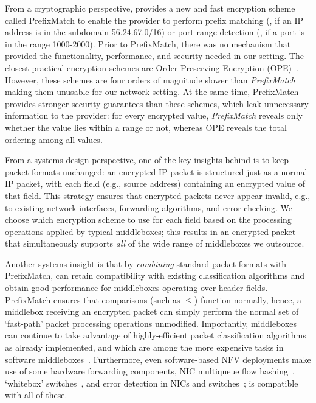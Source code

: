 From a cryptographic perspective, \sys provides a new and fast encryption scheme called PrefixMatch  to enable the provider to perform prefix matching (\eg{}, if an IP address is in the subdomain 56.24.67.0/16) or port range detection (\eg{}, if a port is in the range 1000-2000). Prior to PrefixMatch, there was no mechanism that provided the functionality, performance, and  security needed in our setting. The closest practical encryption schemes are Order-Preserving Encryption (OPE)~\cite{boldyreva:ope,popa:mope,popa:cryptdb}. 
However, these schemes are four orders of magnitude slower than {\it PrefixMatch} making them unusable for our network setting. At the same time, PrefixMatch provides stronger security guarantees than these schemes, which leak unnecessary information to the provider: for every encrypted value, {\em PrefixMatch} reveals only whether the value lies within a range or not, whereas OPE reveals the total ordering among all values.

  From a systems design perspective, one of the key insights behind \sys is to keep packet formats unchanged: an encrypted IP packet is structured just as a normal IP packet, with each field (e.g., source address) containing an encrypted value of that field.
  This strategy ensures that encrypted packets never appear invalid, e.g., to existing network interfaces, forwarding algorithms, and error checking. 
  We choose which encryption scheme to use for each field based on the processing operations applied by typical middleboxes; this results in an encrypted packet that simultaneously supports {\it all} of the wide range of middleboxes we outsource.
  
  Another systems insight is that by {\it combining} standard packet formats with PrefixMatch, \sys can retain compatibility with existing classification algorithms and obtain good performance for middleboxes operating over header fields.
  PrefixMatch ensures that comparisons (such as $\leq$) function normally, hence, a middlebox receiving an encrypted packet can simply perform the normal set of `fast-path' packet processing operations unmodified.
  Importantly, middleboxes can continue to take advantage of highly-efficient packet classification algorithms~\cite{packet_classif} as already implemented, and which are among the more expensive tasks in software middleboxes~\cite{comb, ethan-paper}.
  Furthermore, even software-based NFV deployments make use of some hardware forwarding components, \eg{} NIC multiqueue flow hashing~\cite{nicdocument}, `whitebox' switches~\cite{whitebox}, and error detection in NICs and switches~\cite{nicdocument, ciscov6}; \sys is compatible with all of these.
  
